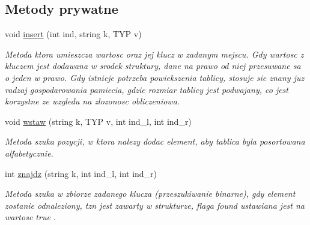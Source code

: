 \subsection*{\-Metody prywatne}
\begin{DoxyCompactItemize}
\item 
void \hyperlink{classtablica__asocjacyjna_a9fc42088f50eca25e7ae4ce8c84ddf4d}{insert} (int ind, string k, \-T\-Y\-P v)
\begin{DoxyCompactList}\small\item\em \-Metoda ktora umieszcza wartosc oraz jej klucz w zadanym mejscu. \-Gdy wartosc z kluczem jest dodawana w srodek struktury, dane na prawo od niej przesuwane sa o jeden w prawo. \-Gdy istnieje potrzeba powiekszenia tablicy, stosuje sie znany juz radzaj gospodarowania pamiecia, gdzie rozmiar tablicy jest podwajany, co jest korzystne ze wzgledu na zlozonosc obliczeniowa. \end{DoxyCompactList}\item 
void \hyperlink{classtablica__asocjacyjna_a5da9eecc7f4e0d7bcf31e8c5c7c49d06}{wstaw} (string k, \-T\-Y\-P v, int ind\-\_\-l, int ind\-\_\-r)
\begin{DoxyCompactList}\small\item\em \-Metoda szuka pozycji, w ktora nalezy dodac element, aby tablica byla posortowana alfabetycznie. \end{DoxyCompactList}\item 
int \hyperlink{classtablica__asocjacyjna_a70a184c5358e47655211e68925c2e12e}{znajdz} (string k, int ind\-\_\-l, int ind\-\_\-r)
\begin{DoxyCompactList}\small\item\em \-Metoda szuka w zbiorze zadanego klucza (przeszukiwanie binarne), gdy element zostanie odnaleziony, tzn jest zawarty w strukturze, flaga {\ttfamily found} {\ttfamily ustawiana} jest na wartosc {\ttfamily true} {\ttfamily }. \end{DoxyCompactList}\end{DoxyCompactItemize}
